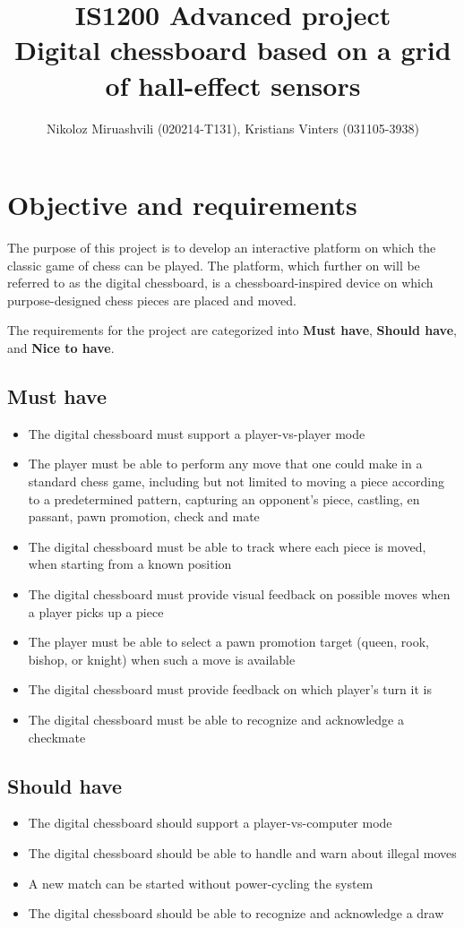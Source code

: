 \documentclass{article}
\title{IS1200 \textbf{Advanced} project\\Digital chessboard based on a grid of hall-effect sensors}
\author{Nikoloz Miruashvili (020214-T131), Kristians Vinters (031105-3938)}
\begin{document}
\maketitle

\section{Objective and requirements}

The purpose of this project is to develop an interactive platform on which the classic game of chess can be played. The platform, which further on will be referred to as the digital chessboard, is a chessboard-inspired device on which purpose-designed chess pieces are placed and moved.

The requirements for the project are categorized into \textbf{Must have}, \textbf{Should have}, and \textbf{Nice to have}.

\subsection*{Must have}
\begin{itemize}
	\item The digital chessboard must support a player-vs-player mode
	\item The player must be able to perform any move that one could make in a standard chess game, including but not limited to moving a piece according to a predetermined pattern, capturing an opponent's piece, castling, en passant, pawn promotion, check and mate
	\item The digital chessboard must be able to track where each piece is moved, when starting from a known position
	\item The digital chessboard must provide visual feedback on possible moves when a player picks up a piece
	\item The player must be able to select a pawn promotion target (queen, rook, bishop, or knight) when such a move is available
	\item The digital chessboard must provide feedback on which player's turn it is
	\item The digital chessboard must be able to recognize and acknowledge a checkmate
\end{itemize}

\subsection*{Should have}
\begin{itemize}
	\item The digital chessboard should support a player-vs-computer mode
	\item The digital chessboard should be able to handle and warn about illegal moves
	\item A new match can be started without power-cycling the system
	\item The digital chessboard should be able to recognize and acknowledge a draw
\end{itemize}
\end{document}
